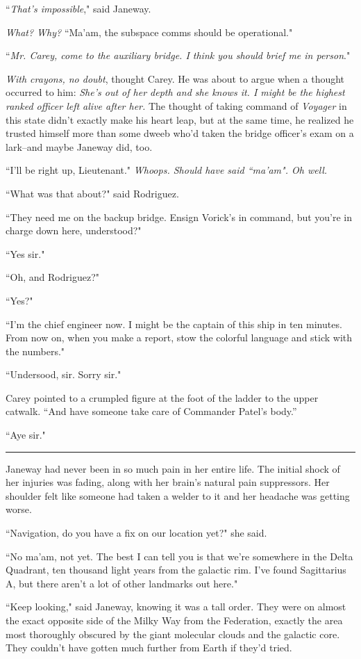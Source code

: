 \documentclass[twoside,letterpaper,12pt]{memoir}
\begin{document}
``\textit{That's impossible}," said Janeway.

\textit{What? Why?} ``Ma'am, the subspace comms should be operational."

``\textit{Mr. Carey, come to the auxiliary bridge. I think you should brief me in person}."

\textit{With crayons, no doubt}, thought Carey. He was about to argue when a thought occurred to him: \textit{She's out of her depth and she knows it. I might be the highest ranked officer left alive after her.} The thought of taking command of \textit{Voyager} in this state didn't exactly make his heart leap, but at the same time, he realized he trusted himself more than some dweeb who'd taken the bridge officer's exam on a lark--and maybe Janeway did, too.

``I'll be right up, Lieutenant." \textit{Whoops. Should have said ``ma'am". Oh well.}

``What was that about?" said Rodriguez.

``They need me on the backup bridge. Ensign Vorick’s in command, but you’re in charge down here, understood?"

``Yes sir."

``Oh, and Rodriguez?"

``Yes?"

``I’m the chief engineer now. I might be the captain of this ship in ten minutes. From now on, when you make a report, stow the colorful language and stick with the numbers."

``Undersood, sir. Sorry sir."

Carey pointed to a crumpled figure at the foot of the ladder to the upper catwalk. ``And have someone take care of Commander Patel’s body.''

``Aye sir."

\fancybreak{\rule{3cm}{0.4 pt}}
Janeway had never been in so much pain in her entire life. The initial shock of her injuries was fading, along with her brain's natural pain suppressors. Her shoulder felt like someone had taken a welder to it and her headache was getting worse.

``Navigation, do you have a fix on our location yet?" she said.

``No ma'am, not yet. The best I can tell you is that we're somewhere in the Delta Quadrant, ten thousand light years from the galactic rim. I've found Sagittarius A, but there aren't a lot of other landmarks out here."

``Keep looking," said Janeway, knowing it was a tall order. They were on almost the exact opposite side of the Milky Way from the Federation, exactly the area most thoroughly obscured by the giant molecular clouds and the galactic core. They couldn't have gotten much further from Earth if they'd tried.
\end{document}
